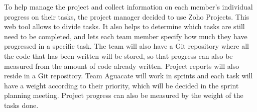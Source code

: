 
To help manage the project and collect information on each member's individual
progress on their tasks, the project manager decided to use Zoho Projects. This
web tool allows to divide tasks. It also helps to determine which tasks are
still need to be completed, and lets each team member specify how much they have
progressed in a specific task. The team will also have a Git repository where
all the code that has been written will be stored, so that progress can also be
measured from the amount of code already written. Project reports will also
reside in a Git repository. Team Aguacate will work in sprints and each task
will have a weight according to their priority, which will be decided in the
sprint planning meeting. Project progress can also be measured by the weight of
the tasks done.
